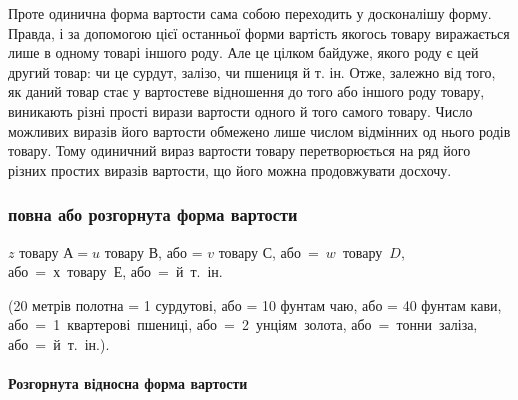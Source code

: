 Проте одинична форма вартости сама собою переходить у досконалішу
форму. Правда, і за допомогою цієї останньої форми вартість
якогось товару виражається лише в одному товарі іншого
роду. Але це цілком байдуже, якого роду є цей другий товар: чи
це сурдут, залізо, чи пшениця й т. ін. Отже, залежно від того,
як даний товар стає у вартостеве відношення до того або іншого
роду товару, виникають різні прості вирази вартости одного й
того самого товару. Число можливих виразів його вартости
обмежено лише числом відмінних од нього родів товару. Тому
одиничний вираз вартости товару перетворюється на ряд його
різних простих виразів вартости, що його можна продовжувати
досхочу.

\subsubsection{повна або розгорнута форма вартости}
\begin{center}
$z$ товару $А = u$ товару $В$, або = $v$ товару $С$, \mbox{або = $w$ товару $D$},\\
\mbox{або = $х$ товару $Е$},  \mbox{або = й т. ін}.

{\small (20 метрів полотна = 1 сурдутові, або = 10 фунтам чаю, або = 40 фунтам
кави, \mbox{або = 1 квартерові пшениці}, \mbox{або = 2 унціям золота},
\mbox{або =  тонни заліза}, \mbox{або = й т. ін.).}}
\end{center}

\paragraph{Розгорнута відносна форма вартости}

